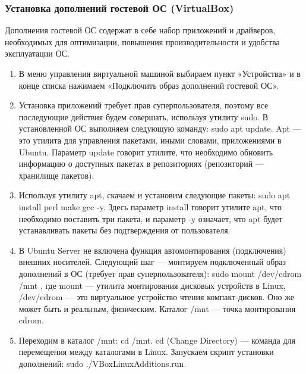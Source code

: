 \documentclass[14pt, a4paper]{article}
\begin{document}
\subsubsection*{Установка дополнений гостевой ОС (VirtualBox)}
Дополнения гостевой ОС содержат в себе набор приложений и драйверов, необходимых для
оптимизации, повышения производительности и удобства эксплуатации ОС.
\begin{enumerate}
    \item В меню управления виртуальной машиной выбираем пункт «Устройства» и в конце списка
    нажимаем «Подключить образ дополнений гостевой ОС».
    \item Установка приложений требует прав суперпользователя, поэтому все последующие действия
    будем совершать, используя утилиту sudo. В установленной ОС выполняем следующую
    команду: \colorbox{backcolour}{sudo apt update}. Apt — это утилита для управления пакетами, иными словами,
    приложениями в Ubuntu. Параметр \colorbox{backcolour}{update} говорит утилите, что необходимо обновить
    информацию о доступных пакетах в репозиториях (репозиторий — хранилище пакетов).
    \item Используя утилиту apt, скачаем и установим следующие пакеты: sudo apt install perl
    make gcc -y. Здесь параметр install говорит утилите apt, что необходимо поставить три
    пакета, и параметр -y означает, что apt будет устанавливать пакеты без подтверждения от
    пользователя.
    \item В Ubuntu Server не включена функция автомонтирования (подключения) внешних носителей.
    Следующий шаг — монтируем подключенный образ дополнений в ОС (требует прав
    суперпользователя): \colorbox{backcolour}{sudo mount /dev/cdrom /mnt} , где \colorbox{backcolour}{mount} — утилита монтирования
    дисковых устройств в Linux, \colorbox{backcolour}{/dev/cdrom} — это виртуальное устройство чтения
    компакт-дисков. Оно же может быть и реальным, физическим. Каталог \colorbox{backcolour}{/mnt} — точка
    монтирования \colorbox{backcolour}{cdrom}.
    \item Переходим в каталог /mnt: \colorbox{backcolour}{cd /mnt}. cd (Change Directory) — команда для перемещения между
    каталогами в Linux. Запускаем скрипт установки дополнений: \colorbox{backcolour}{sudo
    ./VBoxLinuxAdditions.run}.
\end{enumerate}
\end{document}
